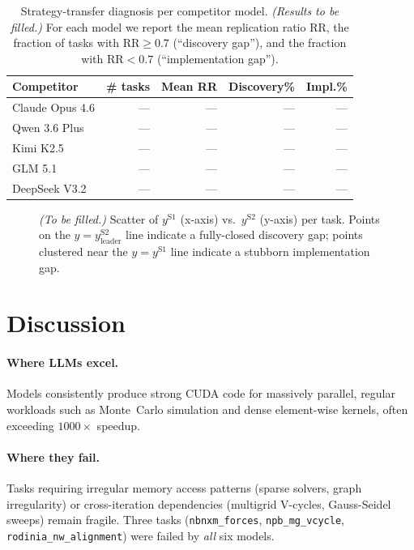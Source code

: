\documentclass{article}
\begin{document}
\begin{table}[ht]
\centering
\small
\caption{Strategy-transfer diagnosis per competitor model.
\emph{(Results to be filled.)} For each model we report the mean
replication ratio $\mathrm{RR}$, the fraction of tasks with
$\mathrm{RR} \geq 0.7$ (``discovery gap''), and the fraction with
$\mathrm{RR} < 0.7$ (``implementation gap'').}
\label{tab:transfer}
\begin{tabular}{@{}lrrrr@{}}
\toprule
\textbf{Competitor} & \textbf{\# tasks} & \textbf{Mean RR} & \textbf{Discovery\%} & \textbf{Impl.\%} \\
\midrule
Claude Opus 4.6 & --- & --- & --- & --- \\
Qwen 3.6 Plus    & --- & --- & --- & --- \\
Kimi K2.5        & --- & --- & --- & --- \\
GLM 5.1          & --- & --- & --- & --- \\
DeepSeek V3.2    & --- & --- & --- & --- \\
\bottomrule
\end{tabular}
\end{table}

\begin{figure}[ht]
\centering
\caption{\emph{(To be filled.)} Scatter of $y^{\mathrm{S1}}$ (x-axis)
vs.\ $y^{\mathrm{S2}}$ (y-axis) per task. Points on the $y = y^{\mathrm{S2}}_{\mathrm{leader}}$ line indicate a fully-closed discovery gap;
points clustered near the $y = y^{\mathrm{S1}}$ line indicate a
stubborn implementation gap.}
\label{fig:transfer}
\end{figure}

\section{Discussion}
\label{sec:discussion}

\paragraph{Where LLMs excel.} Models consistently produce strong CUDA code for massively parallel, regular workloads such as Monte~Carlo simulation and dense element-wise kernels, often exceeding $1000\times$ speedup.

\paragraph{Where they fail.} Tasks requiring irregular memory access patterns (sparse solvers, graph irregularity) or cross-iteration dependencies (multigrid V-cycles, Gauss-Seidel sweeps) remain fragile. Three tasks (\texttt{nbnxm\_forces}, \texttt{npb\_mg\_vcycle}, \texttt{rodinia\_nw\_alignment}) were failed by \emph{all} six models.
\end{document}
